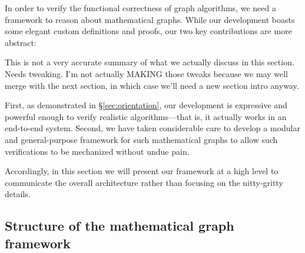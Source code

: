 In order to verify the functional correctness of graph
algorithms, we need a framework to reason about mathematical graphs. 
While our development boasts some elegant custom definitions and proofs, 
our two key contributions are more abstract:

{\color{blue} This is not a very accurate summary of what we actually discuss in 
this section. Needs tweaking. I'm not actually MAKING those tweaks because we may well 
merge with the next section, in which case we'll need a new section intro anyway.}

{\color{magenta} First, as demonstrated in \S\ref{sec:orientation},
our development is expressive and powerful enough to verify realistic
algorithms---that is, it actually works in an end-to-end system.
Second, we have taken considerable care to develop a modular and
general-purpose framework for such mathematical graphs to allow
such verifications to be mechanized without undue pain.}

Accordingly, in this section we will present our framework
at a high level to communicate the overall architecture rather
than focusing on the nitty-gritty details.

\subsection{Structure of the mathematical graph framework}\label{sec:mathinfra}

